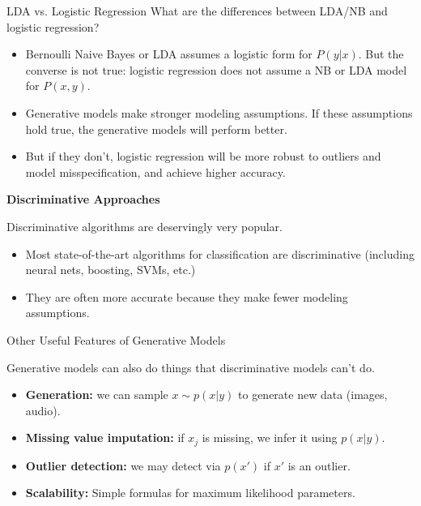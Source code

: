 \documentclass[../../generative_classifiers.tex]{subfiles}
\begin{document}
\begin{frame}[fragile]{LDA vs. Logistic Regression}
What are the differences between LDA/NB and logistic regression?


\begin{itemize}
    \item Bernoulli Naive Bayes or LDA assumes a logistic form for $P(y|x)$. But the converse is not true: logistic regression does not assume a NB or LDA model for $P(x,y)$.
    \item Generative models make stronger modeling assumptions. If these assumptions hold true, the generative models will perform better.
    \item But if they don't, logistic regression will be more robust to outliers and model misspecification, and achieve higher accuracy.
\end{itemize}
\vspace{0.2cm}


\textbf{Discriminative Approaches}

Discriminative algorithms are deservingly very popular.
\begin{itemize}
    \item Most state-of-the-art algorithms for classification are discriminative (including neural nets, boosting, SVMs, etc.)
    \item They are often more accurate because they make fewer modeling assumptions.
\end{itemize}



\end{frame}


\begin{frame}[fragile]{Other Useful Features of Generative Models}


Generative models can also do things that discriminative models can't do.
\begin{itemize}
    \item \textbf{Generation:} we can sample $x \sim p(x|y)$ to generate new data (images, audio).
    \item \textbf{Missing value imputation:} if $x_j$ is missing, we infer it using $p(x|y)$.
    \item \textbf{Outlier detection:} we may detect via $p(x')$ if $x'$ is an outlier.
    \item \textbf{Scalability:} Simple formulas for maximum likelihood parameters.
\end{itemize}

\end{frame}
\end{document}
